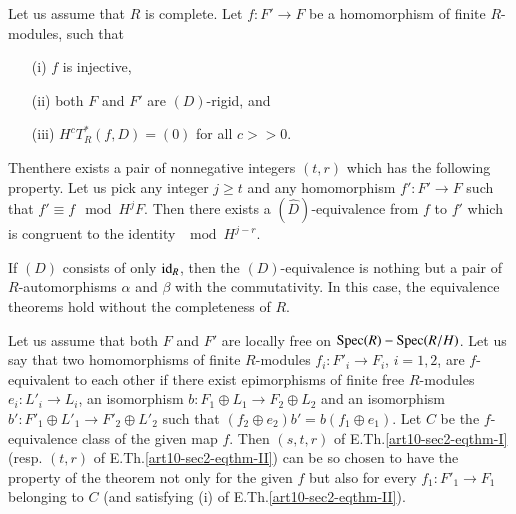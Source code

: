 \begin{eqthm}\label{art10-sec2-eqthm-II}
Let us assume that $R$ is complete. Let $f:F'\to F$ be a homomorphism of finite $R$-modules, such that
\begin{itemize}
\item[\rm(i)] $f$ is injective,

\item[\rm(ii)] both $F$ and $F'$ are $(D)$-rigid, and

\item[\rm(iii)] $H^{c}T^{*}_{R}(f,D)=(0)$ for all $c>>0$.
\end{itemize}

Then\pageoriginale there exists a pair of nonnegative integers $(t,r)$ which has the following property. Let us pick any integer $j\geq t$ and any homomorphism $f':F'\to F$ such that $f'\equiv f\mod H^{j}F$. Then there exists a $(\widehat{D})$-equivalence from $f$ to $f'$ which is congruent to the identity $\mod H^{j-r}$.
\end{eqthm}

\setcounter{subsection}{4}
\begin{subremark}\label{art10-sec2-rem2.4.1}
If $(D)$ consists of only $\operatorname{\mathrm{id}}_{R}$, then the $(D)$-equivalence is nothing but a pair of $R$-automorphisms $\alpha$ and $\beta$ with the commutativity. In this case, the equivalence theorems hold without the completeness of $R$.
\end{subremark}

\begin{subremark}\label{art10-sec2-rem2.4.2}
Let us assume that both $F$ and $F'$ are locally free on $\operatorname{\mathrm{Spec}} (R)-\operatorname{\mathrm{Spec}} (R/H)$. Let us say that two homomorphisms of finite $R$-modules $f_{i}:F'_{i}\to F_{i}$, $i=1,2$, are $f$-equivalent to each other if there exist epimorphisms of finite free $R$-modules $e_{i}:L'_{i}\to L_{i}$, an isomorphism $b:F_{1}\oplus L_{1}\to F_{2}\oplus L_{2}$ and an isomorphism $b':F'_{1}\oplus L'_{1}\to F'_{2}\oplus L'_{2}$ such that $(f_{2}\oplus e_{2})b'=b(f_{1}\oplus e_{1})$. Let $C$ be the $f$-equivalence class of the given map $f$. Then $(s,t,r)$ of E.Th.\ref{art10-sec2-eqthm-I} (resp. $(t,r)$ of E.Th.\ref{art10-sec2-eqthm-II}) can be so chosen to have the property of the theorem not only for the given $f$ but also for every $f_{1}:F'_{1}\to F_{1}$ belonging to $C$ (and satisfying (i) of E.Th.\ref{art10-sec2-eqthm-II}).
\end{subremark}

